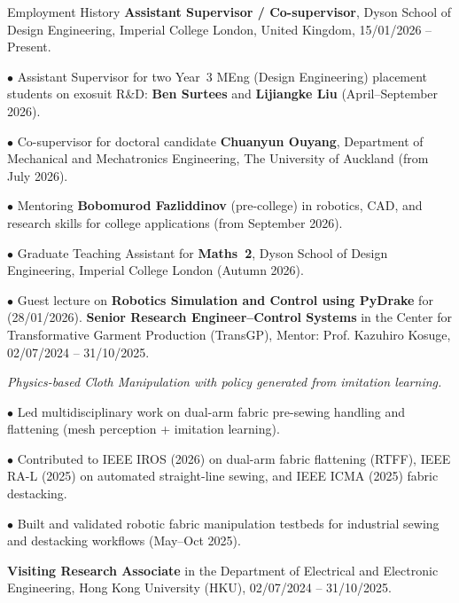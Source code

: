 \begin{rubric}{Employment History}
    \entry*[2026 -- Present]%
        \textbf{Assistant Supervisor / Co-supervisor}, Dyson School of Design Engineering, Imperial College London, United Kingdom, 15/01/2026 -- Present.
        \par $\bullet$ Assistant Supervisor for two Year~3 MEng (Design Engineering) placement students on exosuit R\&D: \textbf{Ben Surtees} and \textbf{Lijiangke Liu} (April--September 2026).
        \par $\bullet$ Co-supervisor for doctoral candidate \textbf{Chuanyun Ouyang}, Department of Mechanical and Mechatronics Engineering, The University of Auckland (from July 2026).
        \par $\bullet$ Mentoring \textbf{Bobomurod Fazliddinov} (pre-college) in robotics, CAD, and research skills for college applications (from September 2026).
        \par $\bullet$ Graduate Teaching Assistant for \textbf{Maths~2}, Dyson School of Design Engineering, Imperial College London (Autumn 2026).
        \par $\bullet$ Guest lecture on \textbf{Robotics Simulation and Control using PyDrake} for  (28/01/2026).
    \entry*[2024--2025]%
        \textbf{Senior Research Engineer--Control Systems} in the Center for Transformative Garment Production (TransGP), Mentor: Prof. Kazuhiro Kosuge, 02/07/2024 -- 31/10/2025.
        \par \textit{Physics-based Cloth Manipulation with policy generated from imitation learning.}
        \par $\bullet$ Led multidisciplinary work on dual-arm fabric pre-sewing handling and flattening (mesh perception + imitation learning).
        \par $\bullet$ Contributed to IEEE IROS (2026) on dual-arm fabric flattening (RTFF), IEEE RA-L (2025) on automated straight-line sewing, and IEEE ICMA (2025) fabric destacking.
        \par $\bullet$ Built and validated robotic fabric manipulation testbeds for industrial sewing and destacking workflows (May--Oct 2025).
    
    
    \entry*[2024 -- 2025]%
        \textbf{Visiting Research Associate} in the Department of Electrical and Electronic Engineering, Hong Kong University (HKU), 02/07/2024 -- 31/10/2025.
        

\end{rubric}
